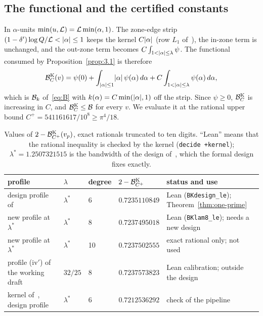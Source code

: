 \subsection{The functional and the certified constants}\label{ssec:K-constants}
In $\alpha$-units $\min(u,\mathcal L)=\mathcal L\min(\alpha,1)$. The zone-edge strip $(1-\delta')\log Q/\mathcal L<\lvert \alpha\rvert\le1$ keeps the kernel
$C\lvert \alpha\rvert$ (row $L_1$ of~\cite{DSouza}), the in-zone term is unchanged, and the out-zone term becomes $C\int_{1<\lvert \alpha\rvert\le\lambda}\psi$.
The functional consumed by Proposition~\ref{prop:3.1} is therefore
\begin{equation}\label{eq:BK}
\mathcal B^{\rm K}_{C}(v)=\psi(0)+\int_{\lvert \alpha\rvert\le1}\lvert \alpha\rvert\,\psi(\alpha)\,d\alpha+C\int_{1<\lvert \alpha\rvert\le\lambda}\psi(\alpha)\,d\alpha,
\end{equation}
which is $\mathcal B_k$ of~\eqref{eq:B} with $k(\alpha)=C\min(\lvert \alpha\rvert,1)$ off the strip. Since $\psi\ge0$, $\mathcal B^{\rm K}_C$ is increasing in
$C$, and $\mathcal B^{\rm K}_C\le\mathcal B$ for every $v$. We evaluate it at the rational upper bound $C^+=541161617/10^8\ge\pi^4/18$.

\begin{table}[ht]\centering\footnotesize
\caption{Values of $2-\mathcal B^{\rm K}_{C^+}(v_p)$, exact rationals truncated to ten digits. ``Lean'' means that the rational inequality is
checked by the kernel (\texttt{decide +kernel}); $\lambda^*=1.2507321515$ is the bandwidth of the design of~\cite{DSouza}, which the formal
design fixes exactly.}\label{tab:K}
\begin{tabular}{@{}llll>{\raggedright\arraybackslash}p{4.9cm}@{}}
\toprule
profile & $\lambda$ & degree & $2-\mathcal B^{\rm K}_{C^+}$ & status and use\\
\midrule
design profile of~\cite{DSouza} & $\lambda^*$ & 6 & $0.7235110849$ & Lean (\texttt{BKdesign\_le}); Theorem~\ref{thm:one-prime}\\
new profile at $\lambda^*$ & $\lambda^*$ & 8 & $0.7237495018$ & Lean (\texttt{BKlam8\_le}); needs a new design\\
new profile at $\lambda^*$ & $\lambda^*$ & 10 & $0.7237502555$ & exact rational only; not used\\
profile (iv$'$) of the working draft & $32/25$ & 8 & $0.7237573823$ & Lean calibration; outside the design\\
kernel of~\cite{DSouza}, design profile & $\lambda^*$ & 6 & $0.7212536292$ & check of the pipeline\\
\bottomrule
\end{tabular}
\end{table}

